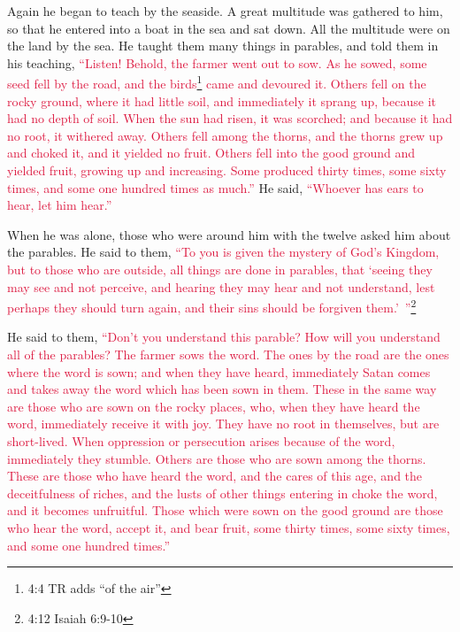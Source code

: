 \mychapter{} \myverse*{}Again he began to teach by the seaside. A great multitude was gathered
to him, so that he entered into a boat in the sea and sat down. All the multitude were on the land by
the sea.
\myverse{}He taught them many things in parables, and told them in his teaching,
\myverse{}\textcolor{crimson}{“Listen! Behold, the farmer went out to sow.
}
\myverse{}\textcolor{crimson}{As he sowed, some seed fell by the road, and the birds}\footnote{4:4 TR adds “of the air”}
\textcolor{crimson}{came and devoured it.
}
\myverse{}\textcolor{crimson}{Others fell on the rocky ground, where it had little soil, and immediately
	it sprang up, because it had no depth of soil.
}
\myverse{}\textcolor{crimson}{When the sun had risen, it was scorched; and because it had no root, it
	withered away.
}
\myverse{}\textcolor{crimson}{Others fell among the thorns, and the thorns grew up and choked it, and
	it yielded no fruit.
}
\myverse{}\textcolor{crimson}{Others fell into the good ground and yielded fruit, growing up and increasing.
	Some produced thirty times, some sixty times, and some one hundred times as much.”}
\myverse{}He said,
\textcolor{crimson}{“Whoever has ears to hear, let him hear.”}

\myverse{}When he was alone, those who were around him with the twelve
asked him about the parables.
\myverse{}He said to them,
\textcolor{crimson}{“To you is given the mystery of God’s Kingdom, but to those who are outside, all things are done in
	parables,
}
\myverse{}\textcolor{crimson}{that ‘seeing they may see and not perceive, and hearing they may hear
	and not understand, lest perhaps they should turn again, and their sins should be forgiven them.’ ”}\footnote{4:12 Isaiah 6:9-10}

\myverse{}He said to them,
\textcolor{crimson}{“Don’t you understand this parable? How will you understand all of the parables?
}
\myverse{}\textcolor{crimson}{The farmer sows the word.
}
\myverse{}\textcolor{crimson}{The ones by the road are the ones where the word is sown; and when they
	have heard, immediately Satan comes and takes away the word which has been sown in them.
}
\myverse{}\textcolor{crimson}{These in the same way are those who are sown on the rocky places, who,
	when they have heard the word, immediately receive it with joy.
}
\myverse{}\textcolor{crimson}{They have no root in themselves, but are short-lived. When oppression
	or persecution arises because of the word, immediately they stumble.
}
\myverse{}\textcolor{crimson}{Others are those who are sown among the thorns. These are those who have
	heard the word,
}
\myverse{}\textcolor{crimson}{and the cares of this age, and the deceitfulness of riches, and the lusts
	of other things entering in choke the word, and it becomes unfruitful.
}
\myverse{}\textcolor{crimson}{Those which were sown on the good ground are those who hear the word,
	accept it, and bear fruit, some thirty times, some sixty times, and some one hundred times.”}

